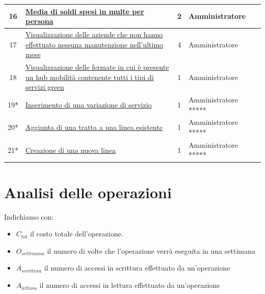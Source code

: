 \documentclass[12pt,a4paper]{report}
\begin{document}
\begin{longtable}{|c|p{9cm}|c|l|l|}
\hline
16 & \hyperref[op16]{Media di soldi spesi in multe per persona} & 2 & Amministratore \\
\hline
17 & \hyperref[op17]{Visualizzazione delle aziende che non hanno effettuato nessuna manutenzione nell'ultimo mese} & 4 & Amministratore \\
\hline
18 & \hyperref[op18]{Visualizzazione delle fermate in cui è presente un hub mobilità contenente tutti i tipi di servizi green} & 1 & Amministratore \\
\hline
19* & \hyperref[op19]{Inserimento di una variazione di servizio} & 1 & Amministratore ***** \\
\hline
20* & \hyperref[op20]{Aggiunta di una tratta a una linea esistente} & 1 & Amministratore ***** \\
\hline
21* & \hyperref[op21]{Creazione di una nuova linea} & 1 & Amministratore ***** \\
\hline
\end{longtable}

\section{Analisi delle operazioni}
Indichiamo con:
\begin{itemize}
	\item ${C_{tot}}$ il costo totale dell'operazione.
	\item ${O_{settimana}}$ il numero di volte che l'operazione verrà eseguita in una settimana
	\item ${A_{scrittura}}$ il numero di accessi in scrittura effettuato da un'operazione
	\item ${A_{lettura}}$ il numero di accessi in lettura effettuato da un'operazione
\end{itemize}
\end{document}
